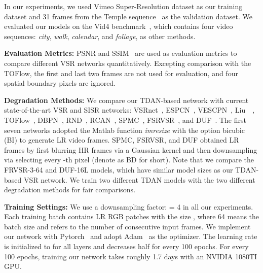 \documentclass[10pt,twocolumn,letterpaper]{article}
\begin{document}
In our experiments, we used Vimeo Super-Resolution dataset as our training dataset and 31 frames from the Temple sequence~\cite{Liao_2015_ICCV} as the validation dataset. We evaluated our models on the Vid4 benchmark~\cite{liu2014bayesian}, which contains four video sequences: \textit{city}, \textit{walk}, \textit{calendar}, and \textit{foliage}, as other methods.

\noindent \textbf{Evaluation Metrics:}
PSNR and SSIM~\cite{wang2004image} are used as evaluation metrics to compare different VSR networks quantitatively. Excepting comparison with the TOFlow, the first and last two frames are not used for evaluation, and four spatial boundary pixels are ignored.

\noindent \textbf{Degradation Methods:}
We compare our TDAN-based network with current state-of-the-art VSR and SISR networks: VSRnet~\cite{kappeler2016video}, ESPCN~\cite{shi2016real}, VESCPN~\cite{caballero2017real}, Liu~\etal~\cite{liu2017robust}, TOFlow~\cite{xue2017video}, DBPN~\cite{haris2018deep}, RND~\cite{zhang2018residual}, RCAN~\cite{zhang2018image}, SPMC~\cite{tao2017detail}, FSRVSR~\cite{sajjadi2018frame}, and DUF~\cite{jo2018deep}. The first seven networks adopted the Matlab function \textit{imresize} with the option bicubic (BI) to generate LR video frames. SPMC, FSRVSR, and DUF obtained LR frames by first blurring HR frames via a Gaussian kernel and
then downsampling via selecting every -th pixel (denote as BD for short). Note that we compare the FRVSR-3-64 and DUF-16L models, which have similar model sizes as our TDAN-based VSR network. We train two different TDAN models with the two different degradation methods for fair comparisons.

\noindent \textbf{Training Settings:}
We use a downsampling factor:  = 4 in all our experiments. Each training batch contains  LR RGB patches with the size , where 64 means the batch size and  refers to the number of consecutive input frames. We implement our network with Pytorch~\cite{paszke2017automatic} and adopt Adam~\cite{kingma2014adam} as the optimizer. The learning rate is initialized to  for all layers and decreases half for every 100 epochs. For every 100 epochs, training our network takes roughly 1.7 days with an NVIDIA 1080TI GPU.
\end{document}

